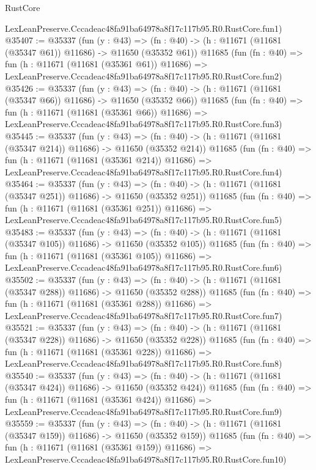 \begin{lexlean}{RustCore}
\begin{coremodule}
    LexLeanPreserve.Cccadeac48fa91ba64978a8f17c117b95.R0.RustCore.fun1)
@35407 := @35337
    (fun (y : @43) =>
    (fn : @40) -> (h : @11671 (@11681 (@35347 @61)) @11686) -> @11650 (@35352 @61))
    @11685
    (fun (fn : @40) =>
    fun (h : @11671 (@11681 (@35361 @61)) @11686) =>
    LexLeanPreserve.Cccadeac48fa91ba64978a8f17c117b95.R0.RustCore.fun2)
@35426 := @35337
    (fun (y : @43) =>
    (fn : @40) -> (h : @11671 (@11681 (@35347 @66)) @11686) -> @11650 (@35352 @66))
    @11685
    (fun (fn : @40) =>
    fun (h : @11671 (@11681 (@35361 @66)) @11686) =>
    LexLeanPreserve.Cccadeac48fa91ba64978a8f17c117b95.R0.RustCore.fun3)
@35445 := @35337
    (fun (y : @43) =>
    (fn : @40) -> (h : @11671 (@11681 (@35347 @214)) @11686) -> @11650 (@35352 @214))
    @11685
    (fun (fn : @40) =>
    fun (h : @11671 (@11681 (@35361 @214)) @11686) =>
    LexLeanPreserve.Cccadeac48fa91ba64978a8f17c117b95.R0.RustCore.fun4)
@35464 := @35337
    (fun (y : @43) =>
    (fn : @40) -> (h : @11671 (@11681 (@35347 @251)) @11686) -> @11650 (@35352 @251))
    @11685
    (fun (fn : @40) =>
    fun (h : @11671 (@11681 (@35361 @251)) @11686) =>
    LexLeanPreserve.Cccadeac48fa91ba64978a8f17c117b95.R0.RustCore.fun5)
@35483 := @35337
    (fun (y : @43) =>
    (fn : @40) -> (h : @11671 (@11681 (@35347 @105)) @11686) -> @11650 (@35352 @105))
    @11685
    (fun (fn : @40) =>
    fun (h : @11671 (@11681 (@35361 @105)) @11686) =>
    LexLeanPreserve.Cccadeac48fa91ba64978a8f17c117b95.R0.RustCore.fun6)
@35502 := @35337
    (fun (y : @43) =>
    (fn : @40) -> (h : @11671 (@11681 (@35347 @288)) @11686) -> @11650 (@35352 @288))
    @11685
    (fun (fn : @40) =>
    fun (h : @11671 (@11681 (@35361 @288)) @11686) =>
    LexLeanPreserve.Cccadeac48fa91ba64978a8f17c117b95.R0.RustCore.fun7)
@35521 := @35337
    (fun (y : @43) =>
    (fn : @40) -> (h : @11671 (@11681 (@35347 @228)) @11686) -> @11650 (@35352 @228))
    @11685
    (fun (fn : @40) =>
    fun (h : @11671 (@11681 (@35361 @228)) @11686) =>
    LexLeanPreserve.Cccadeac48fa91ba64978a8f17c117b95.R0.RustCore.fun8)
@35540 := @35337
    (fun (y : @43) =>
    (fn : @40) -> (h : @11671 (@11681 (@35347 @424)) @11686) -> @11650 (@35352 @424))
    @11685
    (fun (fn : @40) =>
    fun (h : @11671 (@11681 (@35361 @424)) @11686) =>
    LexLeanPreserve.Cccadeac48fa91ba64978a8f17c117b95.R0.RustCore.fun9)
@35559 := @35337
    (fun (y : @43) =>
    (fn : @40) -> (h : @11671 (@11681 (@35347 @159)) @11686) -> @11650 (@35352 @159))
    @11685
    (fun (fn : @40) =>
    fun (h : @11671 (@11681 (@35361 @159)) @11686) =>
    LexLeanPreserve.Cccadeac48fa91ba64978a8f17c117b95.R0.RustCore.fun10)

\end{coremodule}
\end{lexlean}
